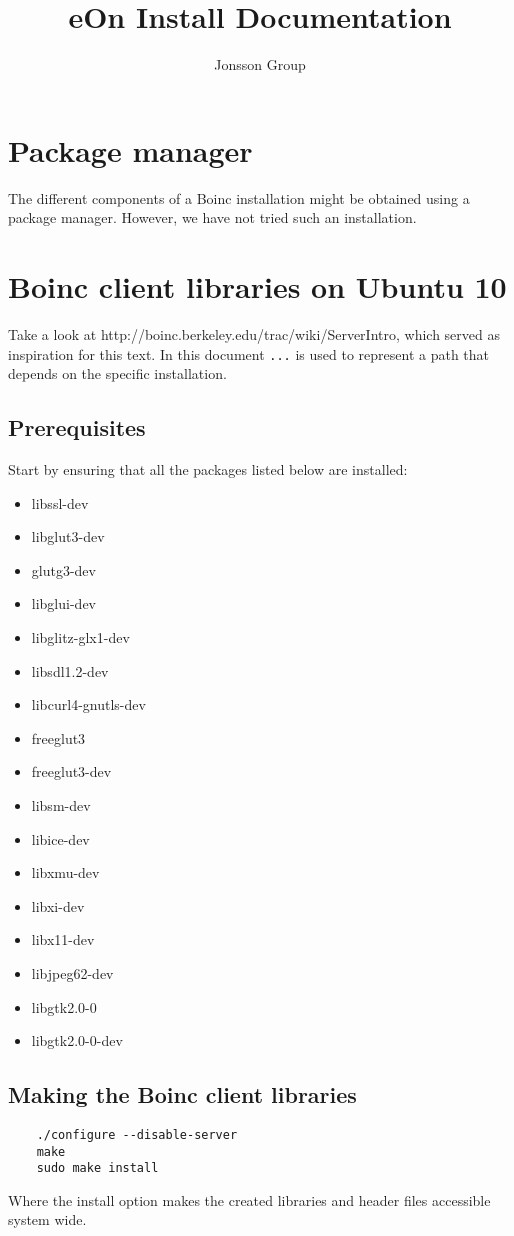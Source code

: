 \documentclass{article}
\begin{document}
\title{eOn Install Documentation}
\author{Jonsson Group}
\maketitle

\section{Package manager}
The different components of a Boinc installation might be obtained using a package manager.  However, we have not tried such an installation.

\section{Boinc client libraries on Ubuntu 10}
Take a look at http://boinc.berkeley.edu/trac/wiki/ServerIntro, which served as inspiration for this text. In this document \texttt{...} is used to represent a path that depends on the specific installation.
%
\subsection{Prerequisites}
Start by ensuring that all the packages listed below are installed:
\begin{itemize}
\item libssl-dev
\item libglut3-dev
\item glutg3-dev
\item libglui-dev
\item libglitz-glx1-dev
\item libsdl1.2-dev
\item libcurl4-gnutls-dev
\item freeglut3
\item freeglut3-dev
\item libsm-dev
\item libice-dev
\item libxmu-dev
\item libxi-dev
\item libx11-dev
\item libjpeg62-dev
\item libgtk2.0-0
\item libgtk2.0-0-dev
\end{itemize}
%
\subsection{Making the Boinc client libraries}
\begin{verbatim}
	./configure --disable-server
	make
	sudo make install
\end{verbatim}
Where the install option makes the created libraries and header files accessible system wide.
%
\end{document}
